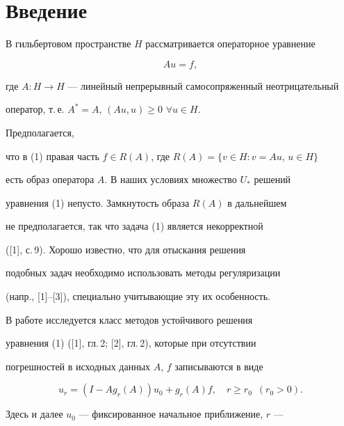 \label{begin} 


 


\section{Введение} 


 


В гильбертовом пространстве $H$ рассматривается операторное уравнение 


\begin{equation} 


A u=f, 


\end{equation} 


где $A:H\to H$ --- линейный непрерывный самосопряженный неотрицательный 


оператор, т.\,е. $A^*=A$, $(Au,u)\ge0$ $\forall u\in H$. 


Предполагается, 


что в (1) правая часть $f\in R(A)$, где $R(A)=\{v\in H:v=Au$, $u\in 


H\}$ 


есть образ оператора $A$. В наших условиях множество $U_*$ решений 


уравнения (1) непусто. Замкнутость образа $R(A)$ в дальнейшем 


не предполагается, так что задача (1) является некорректной 


([1], с.\,9). Хорошо известно, что для отыскания решения 


подобных задач необходимо использовать методы регуляризации 


(напр., [1]--[3]), специально учитывающие эту их особенность. 


 


В работе исследуется класс методов устойчивого решения 


уравнения (1) ([1], гл.\,2; [2], гл.\,2), которые при отсутствии 


погрешностей в исходных данных $A$, $f$ записываются в виде 


\begin{equation} 


u_r=(I-A g_r(A))u_0+g_r(A)f,\quad r\ge r_0\ \;(r_0>0). 


\end{equation} 


Здесь и далее $u_0$ --- фиксированное начальное приближение, $r$ --- 



